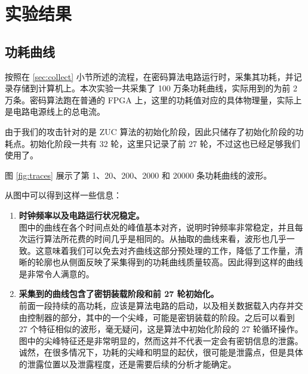 

\chapter{实验结果}

\section{功耗曲线}

按照在 \ref{sec:collect} 小节所述的流程，在密码算法电路运行时，采集其功耗，并记录存储到计算机上。本次实验一共采集了 100 万条功耗曲线，实际用到的为前 2 万条。密码算法跑在普通的 FPGA 上，这里的功耗值对应的具体物理量，实际上是电路电源线上的总电流。

由于我们的攻击针对的是 ZUC 算法的初始化阶段，因此只储存了初始化阶段的功耗点。初始化阶段一共有 32 轮，这里只记录了前 27 轮，不过这也已经足够我们使用了。

\vspace*{\baselineskip}

图 \ref{fig:traces} 展示了第 1、20、200、2000 和 20000 条功耗曲线的波形。

从图中可以得到这样一些信息：

\begin{enumerate}
    \item \textbf{时钟频率以及电路运行状况稳定。}\\
    图中的曲线在各个时间点处的峰值基本对齐，说明时钟频率非常稳定，并且每次运行算法所花费的时间几乎是相同的。从抽取的曲线来看，波形也几乎一致。这意味着我们可以免去对齐曲线这部分预处理的工作，降低了工作量，清晰的轮廓也从侧面反映了采集得到的功耗曲线质量较高。因此得到这样的曲线是非常令人满意的。
    \item \textbf{采集到的曲线包含了密钥装载阶段和前 27 轮初始化。}\\
    前面一段持续的高功耗，应该是算法电路的启动，以及相关数据载入内存并交由控制器的部分，其中的一个尖峰，可能是密钥装载的阶段。之后可以看到 27 个特征相似的波形，毫无疑问，这是算法中初始化阶段的 27 轮循环操作。图中的尖峰特征还是非常明显的，然而这并不代表一定会有密钥信息的泄露。诚然，在很多情况下，功耗的尖峰和明显的起伏，很可能是泄露点，但是具体的泄露位置以及泄露程度，还是需要后续的分析才能确定。
\end{enumerate}

